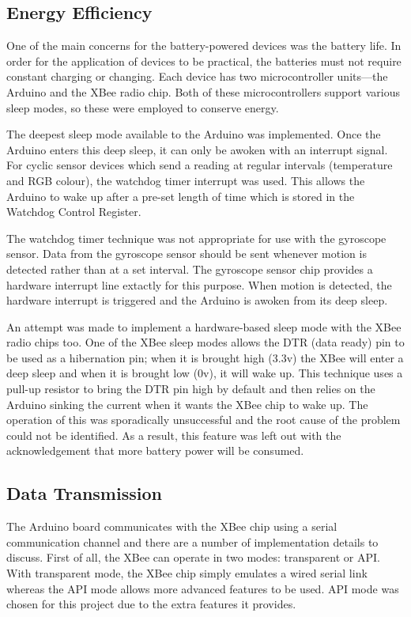     \subsection{Energy Efficiency}
    \label{section:energy-efficiency}
      One of the main concerns for the battery-powered devices was the battery life. In order for the application of devices to be practical, the batteries must not require constant charging or changing. Each device has two microcontroller units---the Arduino and the XBee radio chip. Both of these microcontrollers support various sleep modes, so these were employed to conserve energy.

      The deepest sleep mode available to the Arduino was implemented. Once the Arduino enters this deep sleep, it can only be awoken with an interrupt signal. For cyclic sensor devices which send a reading at regular intervals (temperature and RGB colour), the watchdog timer interrupt was used. This allows the Arduino to wake up after a pre-set length of time which is stored in the Watchdog Control Register.

      The watchdog timer technique was not appropriate for use with the gyroscope sensor. Data from the gyroscope sensor should be sent whenever motion is detected rather than at a set interval. The gyroscope sensor chip provides a hardware interrupt line extactly for this purpose. When motion is detected, the hardware interrupt is triggered and the Arduino is awoken from its deep sleep.

      An attempt was made to implement a hardware-based sleep mode with the XBee radio chips too. One of the XBee sleep modes allows the DTR (data ready) pin to be used as a hibernation pin; when it is brought high (3.3v) the XBee will enter a deep sleep and when it is brought low (0v), it will wake up. This technique uses a pull-up resistor to bring the DTR pin high by default and then relies on the Arduino sinking the current when it wants the XBee chip to wake up. The operation of this was sporadically unsuccessful and the root cause of the problem could not be identified. As a result, this feature was left out with the acknowledgement that more battery power will be consumed.

    \subsection{Data Transmission}
    \label{section:data-transmission}
      The Arduino board communicates with the XBee chip using a serial communication channel and there are a number of implementation details to discuss. First of all, the XBee can operate in two modes: transparent or API. With transparent mode, the XBee chip simply emulates a wired serial link whereas the API mode allows more advanced features to be used. API mode was chosen for this project due to the extra features it provides.

